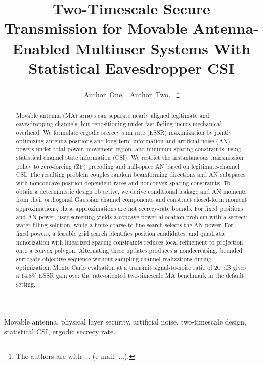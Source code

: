 \documentclass[journal]{IEEEtran}
\begin{document}
\title{Two-Timescale Secure Transmission for Movable Antenna-Enabled Multiuser Systems With Statistical Eavesdropper CSI}

\author{Author~One,~
        Author~Two,~
\thanks{The authors are with ... (e-mail: ...).}}


\maketitle

\begin{abstract}
Movable antenna (MA) arrays can separate nearly aligned legitimate and eavesdropping channels, but repositioning under fast fading incurs mechanical overhead. We formulate ergodic secrecy sum rate (ESSR) maximization by jointly optimizing antenna positions and long-term information and artificial noise (AN) powers under total-power, movement-region, and minimum-spacing constraints, using statistical channel state information (CSI). We restrict the instantaneous transmission policy to zero-forcing (ZF) precoding and null-space AN based on legitimate-channel CSI. The resulting problem couples random beamforming directions and AN subspaces with nonconcave position-dependent rates and nonconvex spacing constraints. To obtain a deterministic design objective, we derive conditional leakage and AN moments from their orthogonal Gaussian channel components and construct closed-form moment approximations; these approximations are not secrecy-rate bounds. For fixed positions and AN power, user screening yields a concave power-allocation problem with a secrecy water-filling solution, while a finite coarse-to-fine search selects the AN power. For fixed powers, a feasible grid search identifies position candidates, and quadratic minorization with linearized spacing constraints reduces local refinement to projection onto a convex polygon. Alternating these updates produces a nondecreasing, bounded surrogate-objective sequence without sampling channel realizations during optimization; Monte Carlo evaluation at a transmit signal-to-noise ratio of 20~dB gives a 14.8\% ESSR gain over the rate-oriented two-timescale MA benchmark in the default setting.
\end{abstract}

\begin{IEEEkeywords}
Movable antenna, physical layer security, artificial noise, two-timescale design, statistical CSI, ergodic secrecy rate.
\end{IEEEkeywords}
\end{document}
